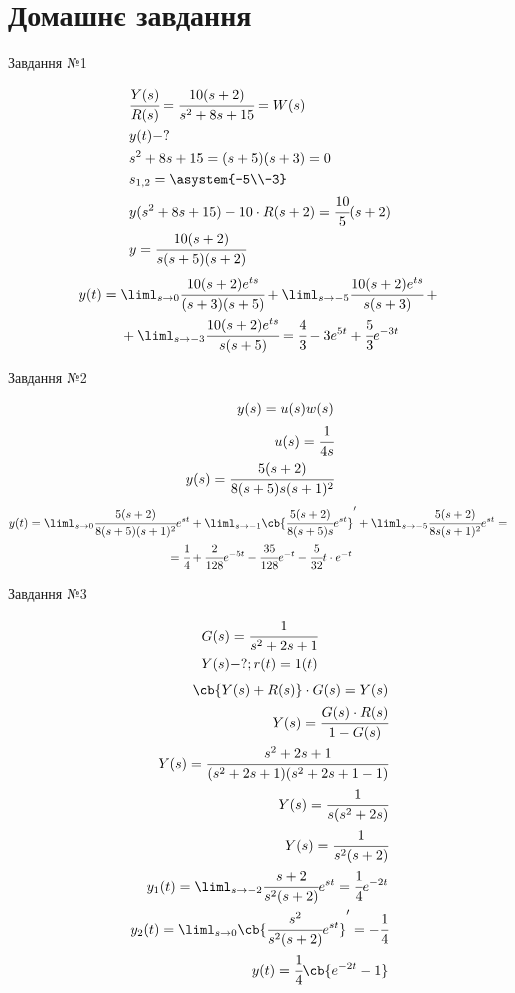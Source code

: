 \section{Домашнє завдання}
\begin{center}
Завдання №1
\end{center}
\begin{eqnarray}
&\cfrac{Y(s)}{R(s)} = \cfrac{10(s+2)}{s^2+8s+15} = W(s)\\
&y(t) - ?\\
&s^2 + 8s + 15  = (s+5) (s+3) = 0 \\
&s_{1,2}  = \asystem{-5\\-3}\\
&y(s^2 + 8s +15) - 10\cdot R(s+2) = \cfrac{10}5 (s+2)\\
&y = \cfrac{10(s+2)}{s (s+5)(s+2)}\\
\end{eqnarray}
\begin{multline}
y(t) = \liml_{s\to 0} \cfrac{10(s+2)e^{ts}}{(s+3)(s+5)} + \liml_{s\to-5} \cfrac{10(s+2)e^{ts}}{s(s+3)} +{} \\ {} + \liml_{s\to -3} \cfrac{10(s+2)e^{ts}}{s(s+5)} = \cfrac43 - 3e^{5t}  + \cfrac53 e^{-3t}
\end{multline}
\begin{center}
Завдання №2
\end{center}
\begin{eqnarray}
y(s) = u(s) w(s)\\
u(s) = \cfrac1{4s}\\
y(s) = \cfrac{5(s+2)}{8(s+5)s(s+1)^2}
\end{eqnarray}
\begin{multline}
y(t) = \liml_{s\to 0} \cfrac{5(s+2)}{8(s+5)(s+1)^2} e^{st} + \liml_{s\to -1} \cb{\cfrac{5(s+2)}{8(s+5)s} e^{st}}' + \liml_{s\to -5} \cfrac{5(s+2)}{8s(s+1)^2} e^{st} ={}\\ {} =  \cfrac14 + \cfrac2{128}e^{-5t} - \cfrac{35}{128} e^{-t} - \cfrac{5}{32} t\cdot e^{-t}
\end{multline}
\begin{center}
Завдання №3
\end{center}
\begin{eqnarray}
G(s) = \cfrac{1}{s^2+2s+1}\\
Y(s) - ?; r(t) = 1(t)
\end{eqnarray}
\begin{eqnarray}
\cb{Y(s)+R(s)}\cdot G(s) = Y(s)\\
Y(s) = \cfrac{G(s)\cdot R(s)}{1-G(s)}\\
Y(s) = \cfrac{s^2+2s+1}{(s^2+2s+1)(s^2+2s+1-1)}\\
Y(s) = \cfrac1{s(s^2+2s)} \\
Y(s) = \cfrac1{s^2(s+2)}\\
y_1(t) = \liml_{s\to -2} \cfrac{s+2}{s^2(s+2)} e^{st} = \cfrac14 e^{-2t}\\
y_2(t) = \liml_{s\to 0} \cb{\cfrac{s^2}{s^2(s+2)} e^{st}}' = -\cfrac14\\
y(t) = \cfrac14\cb{e^{-2t}-1}
\end{eqnarray}
